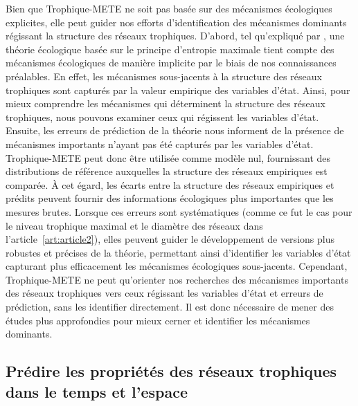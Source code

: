 Bien que Trophique-METE ne soit pas basée sur des mécanismes écologiques
explicites, elle peut guider nos efforts d'identification des mécanismes
dominants régissant la structure des réseaux trophiques. D'abord, tel
qu'expliqué par \textcite{Harte2014Maximum}, une théorie écologique basée sur le
principe d'entropie maximale tient compte des mécanismes écologiques de manière
implicite par le biais de nos connaissances préalables. En effet, les mécanismes
sous-jacents à la structure des réseaux trophiques sont capturés par la valeur
empirique des variables d'état. Ainsi, pour mieux comprendre les mécanismes qui
déterminent la structure des réseaux trophiques, nous pouvons examiner ceux qui
régissent les variables d'état. Ensuite, les erreurs de prédiction de la théorie
nous informent de la présence de mécanismes importants n'ayant pas été capturés
par les variables d'état. Trophique-METE peut donc être utilisée comme modèle
nul, fournissant des distributions de référence auxquelles la structure des
réseaux empiriques est comparée. À cet égard, les écarts entre la structure des
réseaux empiriques et prédits peuvent fournir des informations écologiques plus
importantes que les mesures brutes. Lorsque ces erreurs sont systématiques
(comme ce fut le cas pour le niveau trophique maximal et le diamètre des réseaux
dans l'article~\ref{art:article2}), elles peuvent guider le développement de
versions plus robustes et précises de la théorie, permettant ainsi d'identifier
les variables d'état capturant plus efficacement les mécanismes écologiques
sous-jacents. Cependant, Trophique-METE ne peut qu'orienter nos recherches des
mécanismes importants des réseaux trophiques vers ceux régissant les variables
d'état et erreurs de prédiction, sans les identifier directement. Il est donc
nécessaire de mener des études plus approfondies pour mieux cerner et identifier
les mécanismes dominants.


\subsection{Prédire les propriétés des réseaux trophiques dans le temps et l'espace} 

